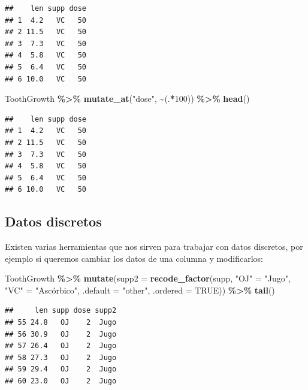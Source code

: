 \documentclass[
]{book}
\newenvironment{Shaded}{\begin{snugshade}}{\end{snugshade}}
\newcommand{\AttributeTok}[1]{\textcolor[rgb]{0.13,0.29,0.53}{#1}}
\newcommand{\ConstantTok}[1]{\textcolor[rgb]{0.56,0.35,0.01}{#1}}
\newcommand{\DecValTok}[1]{\textcolor[rgb]{0.00,0.00,0.81}{#1}}
\newcommand{\FunctionTok}[1]{\textcolor[rgb]{0.13,0.29,0.53}{\textbf{#1}}}
\newcommand{\NormalTok}[1]{#1}
\newcommand{\OtherTok}[1]{\textcolor[rgb]{0.56,0.35,0.01}{#1}}
\newcommand{\SpecialCharTok}[1]{\textcolor[rgb]{0.81,0.36,0.00}{\textbf{#1}}}
\newcommand{\StringTok}[1]{\textcolor[rgb]{0.31,0.60,0.02}{#1}}
\begin{document}
\begin{verbatim}
##    len supp dose
## 1  4.2   VC   50
## 2 11.5   VC   50
## 3  7.3   VC   50
## 4  5.8   VC   50
## 5  6.4   VC   50
## 6 10.0   VC   50
\end{verbatim}

\begin{Shaded}
\begin{Highlighting}[]
\NormalTok{ToothGrowth }\SpecialCharTok{\%\textgreater{}\%}  \FunctionTok{mutate\_at}\NormalTok{(}\StringTok{"dose"}\NormalTok{, }\SpecialCharTok{\textasciitilde{}}\NormalTok{(.}\SpecialCharTok{*}\DecValTok{100}\NormalTok{)) }\SpecialCharTok{\%\textgreater{}\%} \FunctionTok{head}\NormalTok{()}
\end{Highlighting}
\end{Shaded}

\begin{verbatim}
##    len supp dose
## 1  4.2   VC   50
## 2 11.5   VC   50
## 3  7.3   VC   50
## 4  5.8   VC   50
## 5  6.4   VC   50
## 6 10.0   VC   50
\end{verbatim}

\hfill\break

\subsection{Datos discretos}\label{datos-discretos}

Existen varias herramientas que nos sirven para trabajar con datos discretos, por ejemplo si queremos cambiar los datos de una columna y modificarlos:

\begin{Shaded}
\begin{Highlighting}[]
\NormalTok{ToothGrowth }\SpecialCharTok{\%\textgreater{}\%}  \FunctionTok{mutate}\NormalTok{(}\AttributeTok{supp2 =} \FunctionTok{recode\_factor}\NormalTok{(supp,}
                        \StringTok{"OJ"} \OtherTok{=} \StringTok{"Jugo"}\NormalTok{,}
                        \StringTok{"VC"} \OtherTok{=} \StringTok{"Ascórbico"}\NormalTok{,}
                        \AttributeTok{.default =} \StringTok{"other"}\NormalTok{,}
                        \AttributeTok{.ordered =} \ConstantTok{TRUE}\NormalTok{)) }\SpecialCharTok{\%\textgreater{}\%} \FunctionTok{tail}\NormalTok{()}
\end{Highlighting}
\end{Shaded}

\begin{verbatim}
##     len supp dose supp2
## 55 24.8   OJ    2  Jugo
## 56 30.9   OJ    2  Jugo
## 57 26.4   OJ    2  Jugo
## 58 27.3   OJ    2  Jugo
## 59 29.4   OJ    2  Jugo
## 60 23.0   OJ    2  Jugo
\end{verbatim}
\end{document}
